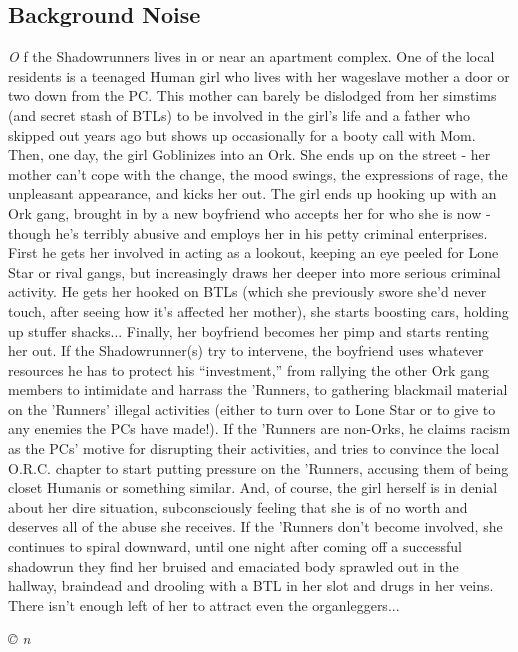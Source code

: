 \documentclass[letterpaper,onecolumn,10pt]{article}
\renewcommand{\textsc}[1]{{\fontspec{Friz Quadrata SC TT}\selectfont #1}}
\newcommand{\getyear}[1]{\StrLeft{#1}{4}}
\newenvironment{scenario}[6]
	{
		\section[#1 {\small\textsc{[#2]}}]{#1} \nopagebreak

		\noindent{\textsc{#2}}\nopagebreak

		\noindent\textit{#3}\nopagebreak
		\def\TMPSCENARIO{{\small\textit{©\getyear{#5}{} #4}}}
	}
	{\TMPSCENARIO}
\newcommand{\sectionlabel}[1]{\textbf{#1: }}
\newcommand{\synopsis}{\sectionlabel{Synopsis}}
\begin{document}
\begin{multicols}{2}
\begin{scenario}{Background Noise}
\synopsis One of the Shadowrunners lives in or near an apartment complex. One of the local residents is a teenaged Human girl who lives with her wageslave mother a door or two down from the PC. This mother can barely be dislodged from her simstims (and secret stash of BTLs) to be involved in the girl's life and a father who skipped out years ago but shows up occasionally for a booty call with Mom. Then, one day, the girl Goblinizes into an Ork. She ends up on the street - her mother can't cope with the change, the mood swings, the expressions of rage, the unpleasant appearance, and kicks her out. The girl ends up hooking up with an Ork gang, brought in by a new boyfriend who accepts her for who she is now - though he's terribly abusive and employs her in his petty criminal enterprises. First he gets her involved in acting as a lookout, keeping an eye peeled for Lone Star or rival gangs, but increasingly draws her deeper into more serious criminal activity. He gets her hooked on BTLs (which she previously swore she'd never touch, after seeing how it's affected her mother), she starts boosting cars, holding up stuffer shacks... Finally, her boyfriend becomes her pimp and starts renting her out. If the Shadowrunner(s) try to intervene, the boyfriend uses whatever resources he has to protect his ``investment,'' from rallying the other Ork gang members to intimidate and harrass the 'Runners, to gathering blackmail material on the 'Runners' illegal activities (either to turn over to Lone Star or to give to any enemies the PCs have made!). If the 'Runners are non-Orks, he claims racism as the PCs' motive for disrupting their activities, and tries to convince the local O.R.C. chapter to start putting pressure on the 'Runners, accusing them of being closet Humanis or something similar. And, of course, the girl herself is in denial about her dire situation, subconsciously feeling that she is of no worth and deserves all of the abuse she receives. If the 'Runners don't become involved, she continues to spiral downward, until one night after coming off a successful shadowrun they find her bruised and emaciated body sprawled out in the hallway, braindead and drooling with a BTL in her slot and drugs in her veins. There isn't enough left of her to attract even the organleggers...


\end{scenario}
\end{multicols}
\end{document}
